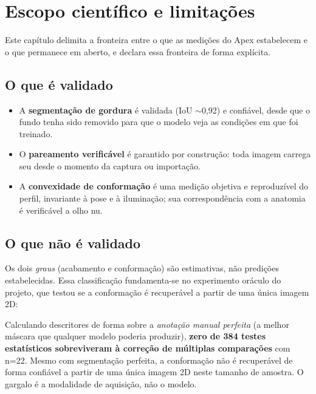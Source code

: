 \chapter{Escopo científico e limitações}


\vspace{4pt}
Este capítulo delimita a fronteira entre o que as medições do Apex estabelecem
e o que permanece em aberto, e declara essa fronteira de forma explícita.

\section{O que é validado}

\begin{itemize}[leftmargin=1.3em,itemsep=3pt]
  \item A \textbf{segmentação de gordura} é validada (IoU $\sim$0,92) e confiável,
        desde que o fundo tenha sido removido para que o modelo veja as condições
        em que foi treinado.
  \item O \textbf{pareamento verificável} é garantido por construção: toda imagem
        carrega seu  desde o momento da captura ou importação.
  \item A \textbf{convexidade de conformação} é uma medição objetiva e
        reproduzível do perfil, invariante à pose e à iluminação; sua
        correspondência com a anatomia é verificável a olho nu.
\end{itemize}

\section{O que não é validado}

Os dois \emph{graus} (acabamento e conformação) são estimativas, não
predições estabelecidas. Essa classificação fundamenta-se no experimento oráculo do projeto,
que testou se a conformação é recuperável a partir de uma única imagem 2D:

\begin{caution}[title=O resultado do oráculo]
Calculando descritores de forma sobre a \emph{anotação manual perfeita} (a
melhor máscara que qualquer modelo poderia produzir), \textbf{zero de 384
testes estatísticos sobreviveram à correção de múltiplas comparações} com n=22.
Mesmo com segmentação perfeita, a conformação não é recuperável de forma
confiável a partir de uma única imagem 2D neste tamanho de amostra. O gargalo é
a modalidade de aquisição, não o modelo.
\end{caution}


